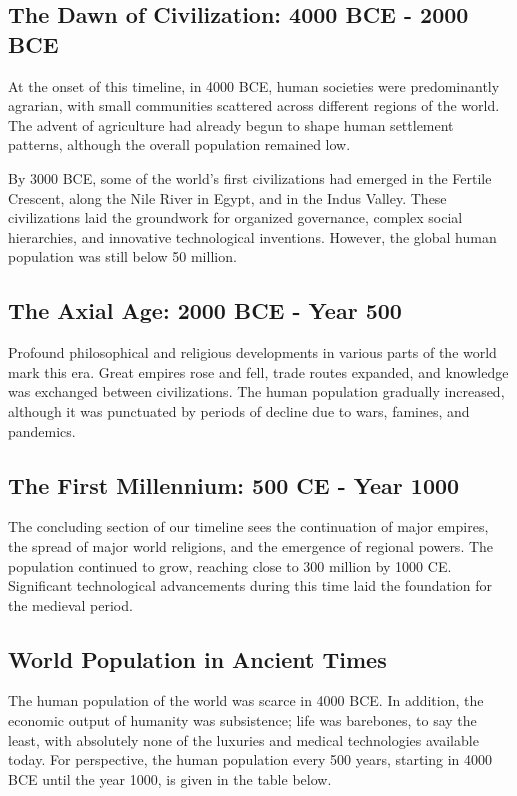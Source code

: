 \documentclass{book}
\begin{document}
\subsection*{The Dawn of Civilization: 4000 BCE - 2000 BCE}
At the onset of this timeline, in 4000 BCE, human societies were predominantly agrarian, with small communities scattered across different regions of the world. The advent of agriculture had already begun to shape human settlement patterns, although the overall population remained low.

By 3000 BCE, some of the world's first civilizations had emerged in the Fertile Crescent, along the Nile River in Egypt, and in the Indus Valley. These civilizations laid the groundwork for organized governance, complex social hierarchies, and innovative technological inventions. However, the global human population was still below 50 million.

\subsection*{The Axial Age: 2000 BCE - Year 500}
Profound philosophical and religious developments in various parts of the world mark this era. Great empires rose and fell, trade routes expanded, and knowledge was exchanged between civilizations. The human population gradually increased, although it was punctuated by periods of decline due to wars, famines, and pandemics.

\subsection*{The First Millennium: 500 CE - Year 1000}
The concluding section of our timeline sees the continuation of major empires, the spread of major world religions, and the emergence of regional powers. The population continued to grow, reaching close to 300 million by 1000 CE. Significant technological advancements during this time laid the foundation for the medieval period.

\subsection*{World Population in Ancient Times}
The human population of the world was scarce in 4000 BCE. In addition, the economic output of humanity was subsistence; life was barebones, to say the least, with absolutely none of the luxuries and medical technologies available today. For perspective, the human population every 500 years, starting in 4000 BCE until the year 1000, is given in the table below.
\end{document}
